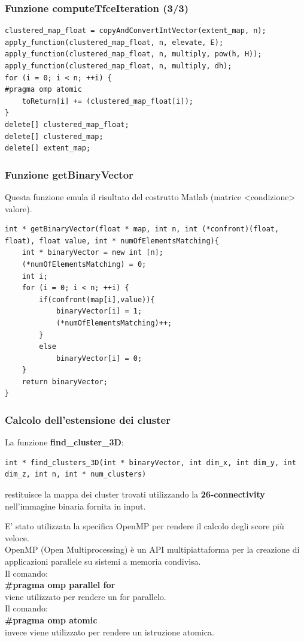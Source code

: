 \documentclass{beamer}
\begin{document}
\begin{frame}[fragile]
\frametitle{Funzione computeTfceIteration (3/3)}
\begin{center}
\begin{lstlisting}
clustered_map_float = copyAndConvertIntVector(extent_map, n);
apply_function(clustered_map_float, n, elevate, E);
apply_function(clustered_map_float, n, multiply, pow(h, H));
apply_function(clustered_map_float, n, multiply, dh);
for (i = 0; i < n; ++i) {
#pragma omp atomic
    toReturn[i] += (clustered_map_float[i]);
}
delete[] clustered_map_float;
delete[] clustered_map;
delete[] extent_map;
\end{lstlisting}
\end{center}
\end{frame}

\begin{frame}[fragile]
\frametitle{Funzione getBinaryVector}
Questa funzione emula il risultato del costrutto Matlab (matrice <condizione> valore).
\begin{center}
\begin{lstlisting}
int * getBinaryVector(float * map, int n, int (*confront)(float, float), float value, int * numOfElementsMatching){
    int * binaryVector = new int [n];
    (*numOfElementsMatching) = 0;
    int i;
    for (i = 0; i < n; ++i) {
        if(confront(map[i],value)){
            binaryVector[i] = 1;
            (*numOfElementsMatching)++;
        }
        else
            binaryVector[i] = 0;
    }
    return binaryVector;
}
\end{lstlisting}
\end{center}
\end{frame}

\begin{frame}[fragile]
\frametitle{Calcolo dell'estensione dei cluster}
La funzione \textbf{find\_cluster\_3D}:\\
\begin{lstlisting}
int * find_clusters_3D(int * binaryVector, int dim_x, int dim_y, int dim_z, int n, int * num_clusters)
\end{lstlisting}

restituisce la mappa dei cluster trovati utilizzando la \textbf{26-connectivity} nell'immagine binaria fornita in input.
\end{frame}

\begin{frame}[fragile]
E' stato utilizzata la specifica OpenMP per rendere il calcolo degli score più veloce.\\
\medskip
OpenMP (Open Multiprocessing) è un API multipiattaforma per la creazione di applicazioni parallele su sistemi a memoria condivisa.\\
\smallskip
Il comando:\\
\textbf{\#pragma omp parallel for}\\
viene utilizzato per rendere un for parallelo.\\
\smallskip
Il comando:\\
\textbf{\#pragma omp atomic}\\
invece viene utilizzato per rendere un istruzione atomica.\\
\end{frame}
\end{document}
